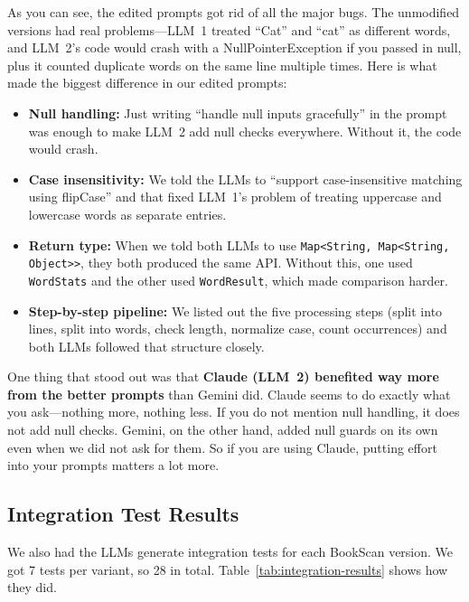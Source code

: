 \documentclass[12pt, a4paper]{article}
\begin{document}
As you can see, the edited prompts got rid of all the major bugs. The unmodified versions had real problems---LLM~1 treated ``Cat'' and ``cat'' as different words, and LLM~2's code would crash with a NullPointerException if you passed in null, plus it counted duplicate words on the same line multiple times. Here is what made the biggest difference in our edited prompts:

\begin{itemize}
    \item \textbf{Null handling:} Just writing ``handle null inputs gracefully'' in the prompt was enough to make LLM~2 add null checks everywhere. Without it, the code would crash.
    \item \textbf{Case insensitivity:} We told the LLMs to ``support case-insensitive matching using flipCase'' and that fixed LLM~1's problem of treating uppercase and lowercase words as separate entries.
    \item \textbf{Return type:} When we told both LLMs to use \texttt{Map<String, Map<String, Object>>}, they both produced the same API. Without this, one used \texttt{WordStats} and the other used \texttt{WordResult}, which made comparison harder.
    \item \textbf{Step-by-step pipeline:} We listed out the five processing steps (split into lines, split into words, check length, normalize case, count occurrences) and both LLMs followed that structure closely.
\end{itemize}

One thing that stood out was that \textbf{Claude (LLM~2) benefited way more from the better prompts} than Gemini did. Claude seems to do exactly what you ask---nothing more, nothing less. If you do not mention null handling, it does not add null checks. Gemini, on the other hand, added null guards on its own even when we did not ask for them. So if you are using Claude, putting effort into your prompts matters a lot more.

\subsection{Integration Test Results}

We also had the LLMs generate integration tests for each BookScan version. We got 7 tests per variant, so 28 in total. Table~\ref{tab:integration-results} shows how they did.
\end{document}
